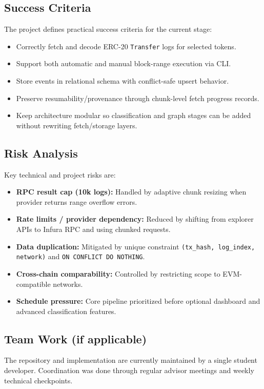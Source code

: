 \documentclass[a4paper,12pt]{report}
\begin{document}
\subsection{Success Criteria}
The project defines practical success criteria for the current stage:
\begin{itemize}
\item Correctly fetch and decode ERC-20 \texttt{Transfer} logs for selected tokens.
\item Support both automatic and manual block-range execution via CLI.
\item Store events in relational schema with conflict-safe upsert behavior.
\item Preserve resumability/provenance through chunk-level fetch progress records.
\item Keep architecture modular so classification and graph stages can be added without
rewriting fetch/storage layers.
\end{itemize}

\subsection{Risk Analysis}
Key technical and project risks are:
\begin{itemize}
\item \textbf{RPC result cap (10k logs):} Handled by adaptive chunk resizing when provider returns range
overflow errors.
\item \textbf{Rate limits / provider dependency:} Reduced by shifting from explorer APIs to Infura RPC and
using chunked requests.
\item \textbf{Data duplication:} Mitigated by unique constraint \texttt{(tx\_hash, log\_index, network)} and
\texttt{ON CONFLICT DO NOTHING}.
\item \textbf{Cross-chain comparability:} Controlled by restricting scope to EVM-compatible networks.
\item \textbf{Schedule pressure:} Core pipeline prioritized before optional dashboard and advanced
classification features.
\end{itemize}

\subsection{Team Work (if applicable)}
The repository and implementation are currently maintained by a single student developer.
Coordination was done through regular advisor meetings and weekly technical checkpoints.
\end{document}
